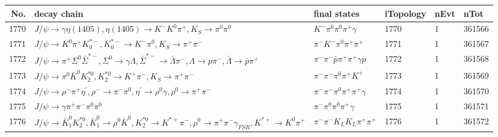\begin{table}[htbp] 
\begin{center}
\begin{small}
\begin{tabular}{rlllll}\hline\hline
 No. & decay chain & final states &  iTopology & nEvt & nTot \\\hline
1770&$J/\psi       \rightarrow \gamma       \eta(1405)    , \eta(1405)     \rightarrow K^{-}          K^{0}          \pi^{+}        , K_{S}           \rightarrow \pi^{0}        \pi^{0}        $&$K^{-}          \pi^{0}        \pi^{0}        \pi^{+}        \gamma       $& 1770&    1&361566\\
1771&$J/\psi       \rightarrow K^{0}          \pi^{+}        K_{0}^{*-}     , K_{0}^{*-}      \rightarrow K^{-}          \pi^{0}        , K_{S}           \rightarrow \pi^{+}        \pi^{-}        $&$\pi^{-}        K^{-}          \pi^{0}        \pi^{+}        \pi^{+}        $& 1771&    1&361567\\
1772&$J/\psi       \rightarrow \pi^{+}        \Sigma^0          \bar{\Sigma}^{*-}, \Sigma^0           \rightarrow \gamma       \Lambda           , \bar{\Sigma}^{*-} \rightarrow \bar{\Lambda}    \pi^{-}        , \Lambda            \rightarrow p                 \pi^{-}        , \bar{\Lambda}     \rightarrow \bar{p}          \pi^{+}        $&$\pi^{-}        \pi^{-}        \bar{p}          \pi^{+}        \pi^{+}        \gamma       p                 $& 1772&    1&361568\\
1773&$J/\psi       \rightarrow \pi^{0}        \bar{K}^{0}   K_2^{*0}       , K_2^{*0}        \rightarrow K^{+}          \pi^{-}        , K_{S}           \rightarrow \pi^{+}        \pi^{-}        $&$\pi^{-}        \pi^{-}        \pi^{0}        \pi^{+}        K^{+}          $& 1773&    1&361569\\
1774&$J/\psi       \rightarrow \rho^{-}      \pi^{+}        \eta^{\prime} , \rho^{-}       \rightarrow \pi^{-}        \pi^{0}        , \eta^{\prime}  \rightarrow \rho^{0}      \gamma       , \rho^{0}       \rightarrow \pi^{+}        \pi^{-}        $&$\pi^{-}        \pi^{-}        \pi^{0}        \pi^{+}        \pi^{+}        \gamma       $& 1774&    1&361570\\
1775&$J/\psi       \rightarrow \gamma       \pi^{+}        \pi^{-}        \pi^{0}        \pi^{0}        $&$\pi^{-}        \pi^{0}        \pi^{0}        \pi^{+}        \gamma       $& 1775&    1&361571\\
1776&$J/\psi       \rightarrow \bar{K}_1^{0} K_2^{*0}       , \bar{K}_1^{0}  \rightarrow \rho^{0}      \bar{K}^{0}   , K_2^{*0}        \rightarrow K^{*+}         \pi^{-}        , \rho^{0}       \rightarrow \pi^{+}        \pi^{-}        \gamma_{FSR} , K^{*+}          \rightarrow K^{0}          \pi^{+}        $&$\pi^{-}        \pi^{-}        K_{L}          K_{L}          \pi^{+}        \pi^{+}        $& 1776&    1&361572\\

\end{tabular}
\end{small}
\end{center}
\end{table}
